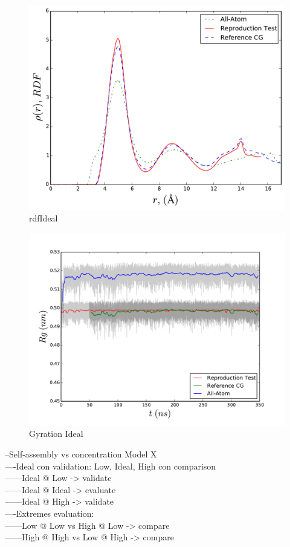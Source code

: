 \documentclass[10pt,a4paper,twoside]{article}
\begin{document}
     \begin{figure}[H]
  \begin{center}
	\includegraphics[width=0.8 \textwidth]{./graphs/rdfI}
	\caption{rdfIdeal}
	\label{gfx:rdfI}
	\end{center}
	\end{figure}
	     \begin{figure}[H]
  \begin{center}
		\includegraphics[width=0.8 \textwidth]{./graphs/GyraI}
	\caption{Gyration Ideal}
	\label{gfx:gyrI}
	\end{center}
	\end{figure}
	
 --Self-assembly vs concentration Model X\\
  ----Ideal con validation: Low, Ideal, High con comparison\\
   ------Ideal @ Low -> validate\\
   ------Ideal @ Ideal -> evaluate\\
   ------Ideal @ High -> validate\\
  ----Extremes evaluation:\\
  ------Low @ Low vs High @ Low -> compare\\
   ------High @ High vs Low @ High -> compare\\
\end{document}
